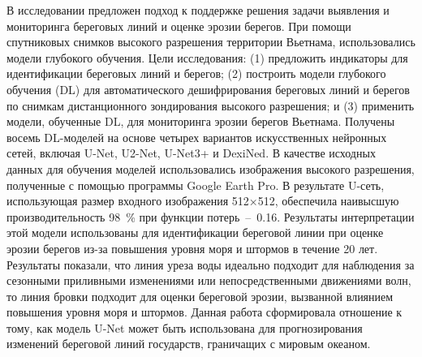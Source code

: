 \documentclass[732,fontsize=14pt,final]{studrep}
\begin{document}
В исследовании \cite{b1} предложен подход к поддержке решения задачи выявления и мониторинга береговых линий и оценке эрозии берегов. При помощи спутниковых снимков высокого разрешения территории Вьетнама, использовались модели глубокого обучения. Цели исследования: (1) предложить индикаторы для идентификации береговых линий и берегов; (2) построить модели глубокого обучения (DL) для автоматического дешифрирования береговых линий и берегов по снимкам дистанционного зондирования высокого разрешения; и (3) применить модели, обученные DL, для мониторинга эрозии берегов Вьетнама. Получены восемь DL-моделей на основе четырех вариантов искусственных нейронных сетей, включая U-Net, U2-Net, U-Net3+ и DexiNed. В качестве исходных данных для обучения моделей использовались изображения высокого разрешения, полученные с помощью программы Google Earth Pro. В результате U-сеть, использующая размер входного изображения 512×512, обеспечила наивысшую производительность 98~\% при функции потерь~--~0.16. Результаты интерпретации этой модели использованы для идентификации береговой линии при оценке эрозии берегов из-за повышения уровня моря и штормов в течение 20 лет. Результаты показали, что линия уреза воды идеально подходит для наблюдения за сезонными приливными изменениями или непосредственными движениями волн, то линия бровки подходит для оценки береговой эрозии, вызванной влиянием повышения уровня моря и штормов. Данная работа сформировала отношение к тому, как модель U-Net может быть использована для прогнозирования изменений береговой линий государств, граничащих с мировым океаном.
\end{document}

